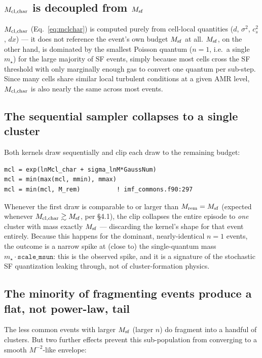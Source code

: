 \documentclass[11pt]{article}
\newcommand{\code}[1]{\texttt{#1}}
\begin{document}
\subsection{$M_{\rm cl,char}$ is decoupled from $M_{\rm sf}$}

$M_{\rm cl,char}$ (Eq.~\ref{eq:mclchar}) is computed purely from
cell-local quantities ($d$, $\sigma^2$, $c_s^2$, $dx$) --- it does not
reference the event's own budget $M_{\rm sf}$ at all. $M_{\rm sf}$, on the
other hand, is dominated by the smallest Poisson quantum ($n=1$, i.e.\ a
single $m_\star$) for the large majority of SF events, simply because most
cells cross the SF threshold with only marginally enough gas to convert one
quantum per sub-step. Since many cells share similar local turbulent
conditions at a given AMR level, $M_{\rm cl,char}$ is also nearly the same
across most events.

\subsection{The sequential sampler collapses to a single cluster}

Both kernels draw sequentially and clip each draw to the remaining budget:
\begin{lstlisting}
mcl = exp(lnMcl_char + sigma_lnM*GaussNum)
mcl = min(max(mcl, mmin), mmax)
mcl = min(mcl, M_rem)          ! imf_commons.f90:297
\end{lstlisting}
Whenever the first draw is comparable to or larger than $M_{\rm rem} =
M_{\rm sf}$ (expected whenever $M_{\rm cl,char} \gtrsim M_{\rm sf}$, per
\S4.1), the clip collapses the entire episode to \emph{one} cluster with
mass exactly $M_{\rm sf}$ --- discarding the kernel's shape for that event
entirely. Because this happens for the dominant, nearly-identical $n=1$
events, the outcome is a narrow spike at (close to) the single-quantum mass
$m_\star \cdot \code{scale\_msun}$: this is the observed spike, and it is a
signature of the stochastic SF quantization leaking through, not of
cluster-formation physics.

\subsection{The minority of fragmenting events produce a flat, not power-law, tail}

The less common events with larger $M_{\rm sf}$ (larger $n$) do fragment
into a handful of clusters. But two further effects prevent this
sub-population from converging to a smooth $M^{-2}$-like envelope:
\end{document}
